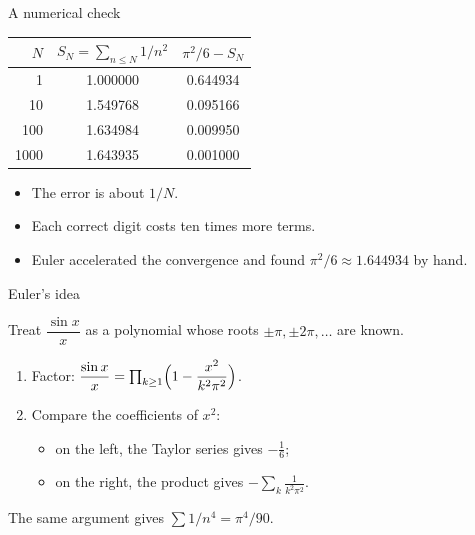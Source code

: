 \documentclass[night,charter,footer]{BeamerJS}
\begin{document}
\begin{frame}{A numerical check}
	\begin{center}
		\begin{tabular}{r S[table-format=1.6] S[table-format=1.6]}
			\toprule
			{$N$} & {$S_N=\sum_{n\leq N}1/n^2$} & {$\pi^2/6-S_N$} \\
			\midrule
			\num{1}    & 1.000000 & 0.644934 \\
			\num{10}   & 1.549768 & 0.095166 \\
			\num{100}  & 1.634984 & 0.009950 \\
			\num{1000} & 1.643935 & 0.001000 \\
			\bottomrule
		\end{tabular}
	\end{center}

	\begin{itemize}[<+->]
		\item The error is about \alert<2>{$1/N$}.
		\item Each correct digit costs \alert<3>{ten times more} terms.
		\item Euler accelerated the convergence and found
			  $\pi^2/6\approx\num{1.644934}$ by hand.
	\end{itemize}
\end{frame}

\begin{frame}{Euler's idea}
	\begin{idea}
		Treat $\dfrac{\sin x}{x}$ as a polynomial whose roots
		$\pm\pi,\pm2\pi,\dots$ are known.
	\end{idea}

	\begin{enumerate}
		\item Factor:
			$\dfrac{\sin x}{x}=\prod_{k\geq1}\Bigl(1-\dfrac{x^2}{k^2\pi^2}\Bigr)$.
		\item Compare the coefficients of $x^2$:
			\begin{itemize}
				\item on the left, the Taylor series gives $-\frac16$;
				\item on the right, the product gives $-\sum_k\frac{1}{k^2\pi^2}$.
			\end{itemize}
	\end{enumerate}

	\begin{ex}
		The same argument gives $\sum 1/n^4=\pi^4/90$.
	\end{ex}
\end{frame}
\end{document}

